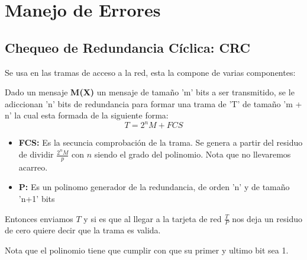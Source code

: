 \documentclass[12pt, fleqn]{report}                             %
\theoremstyle{break}                                            %
\begin{document}
    \chapter{Manejo de Errores}

        \clearpage
        \section{Chequeo de Redundancia Cíclica: CRC}

            Se usa en las tramas de acceso a la red, esta la compone de varias componentes:

            Dado un mensaje \textbf{M(X)} un mensaje de tamaño 'm' bits a ser transmitido, se le adiccionan
            'n' bits de redundancia para formar una trama de 'T' de tamaño 'm + n' la cual esta formada de la
            siguiente forma:
            \begin{equation*}
                T = 2^n M + FCS
            \end{equation*}

            \begin{itemize}
                \item 
                    \textbf{FCS:} Es la secuncia comprobación de la trama. Se genera a partir del residuo de dividir 
                    $\frac{2^n M}{p}$ con $n$ siendo el grado del polinomio. Nota que no llevaremos acarreo.

                \item
                    \textbf{P:} Es un polinomo generador de la redundancia, de orden 'n' y de tamaño 'n+1' bits

            \end{itemize}

            Entonces enviamos $T$ y si es que al llegar a la tarjeta de red $\frac{T}{P}$ nos deja un residuo
            de cero quiere decir que la trama es valida.

            Nota que el polinomio tiene que cumplir con que su primer y ultimo bit sea 1.


\end{document}
